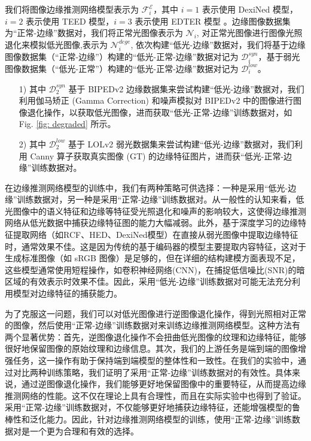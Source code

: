 \documentclass[a4paper]{ctexart}
\begin{document}
		我们将图像边缘推测网络模型表示为 $\mathcal{F}_{i}^{\mathcal{E}}$，其中 $i=1$ 表示使用 DexiNed \cite{Soria_2023}模型，$i=2$ 表示使用 TEED \cite{soria2023tiny}模型，$i=3$ 表示使用 EDTER \cite{pu2022edter}模型 。边缘图像数据集为“正常-边缘”数据对，我们将正常光图像表示为 $\mathcal{N}_{i}$, 对正常光图像进行图像光照退化来模拟低光图像,表示为 $\mathcal{N}_{i}^{dege}$, 依次构建“低光-边缘”数据对，我们将基于边缘图像数据集（“正常-边缘”）构建的“低光-正常-边缘”数据对记为 $\mathcal{D}_{i}^{syn}$，基于弱光图像数据集（“低光-正常”）构建的“低光-正常-边缘”数据对记为 $\mathcal{D}_{i}^{low}$。
		
		\begin{itemize}
			\item[1)]
			其中 $\mathcal{D}_{2}^{syn}$ 基于 BIPEDv2 边缘数据集来尝试构建“低光-边缘”数据对，我们利用伽马矫正 (Gamma Correction) 和噪声模拟对 BIPEDv2 中的图像进行图像退化操作，以获取低光图像，进而获取“低光-正常-边缘”训练数据对，如 Fig. \ref{fig: degraded} 所示。
			
			\item[2)]
			其中 $\mathcal{D}_{2}^{low}$ 基于 LOLv2 弱光数据集来尝试构建“低光-边缘”数据对，我们利用 Canny 算子获取真实图像 (GT) 的边缘特征图片，进而获“低光-正常-边缘”训练数据对。
		\end{itemize}
		
		在边缘推测网络模型的训练中，我们有两种策略可供选择：一种是采用“低光-边缘”训练数据对，另一种是采用“正常-边缘”训练数据对。从一般性的认知来看，低光图像中的语义特征和边缘等特征受光照退化和噪声的影响较大，这使得边缘推测网络从低光数据中捕获边缘特征图的能力大幅减弱。此外，基于深度学习的边缘特征提取网络（如RCF、HED、DexiNed模型）在直接从弱光图像中提取边缘特征时，通常效果不佳。这是因为传统的基于编码器的模型主要提取内容特征，这对于生成标准图像（如 sRGB 图像）是足够的，但在详细的结构建模方面表现不足，这些模型通常使用短程操作，如卷积神经网络(CNN)，在捕捉低信噪比(SNR)的暗区域的有效表示时效果不佳。因此，采用“低光-边缘”训练数据对可能无法充分利用模型对边缘特征的捕获能力。
		
		为了克服这一问题，我们可以对低光图像进行逆图像退化操作，得到光照相对正常的图像，然后使用“正常-边缘”训练数据对来训练边缘推测网络模型。这种方法有两个显著优势：首先，逆图像退化操作不会扭曲低光图像的纹理和边缘特征，能够很好地保留图像的原始纹理和边缘信息。其次，我们的上游任务是端到端的图像增强任务，这一操作有助于保持端到端模型的整体性和一致性。在我们的实验中，通过对比两种训练策略，我们证明了采用“正常-边缘”训练数据对的有效性。具体来说，通过逆图像退化操作，我们能够更好地保留图像中的重要特征，从而提高边缘推测网络的性能。这不仅在理论上具有合理性，而且在实际实验中也得到了验证。采用“正常-边缘”训练数据对，不仅能够更好地捕获边缘特征，还能增强模型的鲁棒性和泛化能力。因此，针对边缘推测网络模型的训练，使用“正常-边缘”训练数据对是一个更为合理和有效的选择。
		
\end{document}
